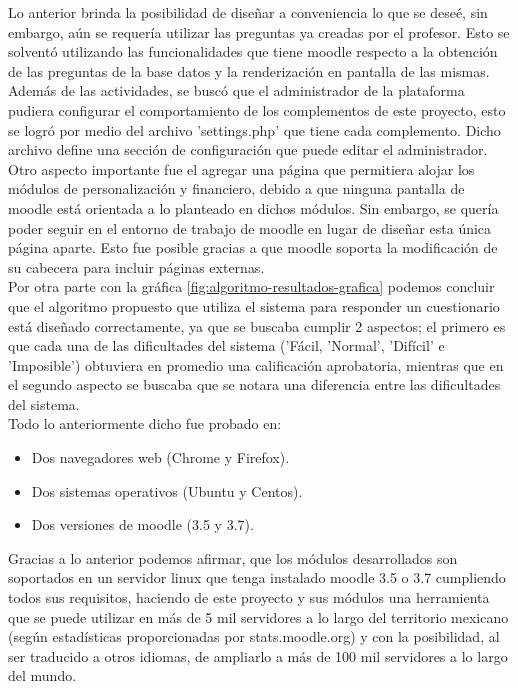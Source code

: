\noindent Lo anterior brinda la posibilidad de diseñar a conveniencia lo que se deseé, sin embargo, aún se requería utilizar las preguntas
ya creadas por el profesor. Esto se solventó utilizando las funcionalidades que tiene moodle respecto a la obtención de las preguntas
de la base datos y la renderización en pantalla de las mismas.\\

\noindent Además de las actividades, se buscó que el administrador de la plataforma pudiera configurar el comportamiento
de los complementos de este proyecto, esto se logró por medio del archivo 'settings.php' que tiene cada complemento. Dicho archivo
define una sección de configuración que puede editar el administrador.\\

\noindent Otro aspecto importante fue el agregar una página que permitiera alojar los módulos de personalización y financiero, 
debido a que ninguna pantalla de moodle está orientada a lo planteado en dichos módulos. Sin embargo, se quería poder seguir en el entorno de trabajo
de moodle en lugar de diseñar esta única página aparte. Esto fue posible gracias a que moodle soporta la modificación
de su cabecera para incluir páginas externas.\\


\noindent Por otra parte con la gráfica \ref{fig:algoritmo-resultados-grafica} podemos concluir que el algoritmo propuesto
 que utiliza el sistema para responder un cuestionario
está diseñado correctamente, ya que se buscaba cumplir 2 aspectos;
el primero es que cada una de las dificultades del sistema ('Fácil, 'Normal', 'Difícil' e 'Imposible') 
obtuviera en promedio una calificación aprobatoria, mientras que en el segundo aspecto
se buscaba que se notara una diferencia entre las dificultades del sistema.\\


\noindent Todo lo anteriormente dicho fue probado en:
\begin{itemize}
    \item Dos navegadores web (Chrome y Firefox).
    \item Dos sistemas operativos (Ubuntu  y Centos).
    \item Dos versiones de moodle (3.5 y 3.7).
\end{itemize}

\noindent Gracias a lo anterior podemos afirmar, que los módulos desarrollados son soportados en un
servidor linux que tenga instalado moodle 3.5 o 3.7 cumpliendo todos sus requisitos, haciendo de este proyecto y sus módulos una herramienta que se puede utilizar
en más de 5 mil servidores a lo largo del territorio mexicano (según estadísticas proporcionadas por stats.moodle.org) y con la posibilidad,
al ser traducido a otros idiomas, de ampliarlo a más de 100 mil servidores a lo largo del mundo.\\

